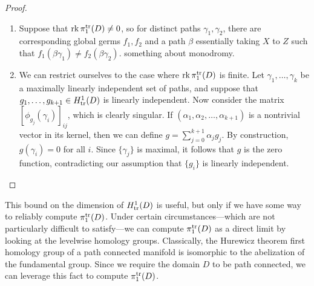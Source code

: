 \begin{proof}
  \phantom{hello!}
\begin{enumerate}
    \item Suppose that \(\operatorname{rk} \pi_1^{\operatorname{tr}}(D) \neq 0\), so for distinct paths
        \(\gamma_1,\gamma_2\), there are corresponding global germs \(f_1,f_2\)
        and a path \(\beta\) essentially taking \(X\) to \(Z\) such that
        \(f_1(\beta\gamma_1)\neq f_2(\beta\gamma_2)\). {\color{blue} something
        about monodromy.}

    \item We can restrict ourselves to the case where \(\operatorname{rk} \pi_1^{\operatorname{tr}}(D)\) is
        finite. Let \(\gamma_1, \dots ,\gamma_k\) be a maximally linearly
        independent set of paths, and suppose that
        \(g_1, \dots , g_{k+1} \in H^1_{\operatorname{tr}}(D)\) is linearly independent. Now
        consider the matrix \([\phi_{g_j}(\gamma_i)]_{ij}\), which is clearly
        singular. If \((\alpha_1, \alpha_2, \dots, \alpha_{k+1})\) is a
        nontrivial vector in its
        kernel, then we can define \(g = \sum_{j=0}^{k+1} \alpha_j g_j\). By
        construction, \(g(\gamma_i)=0\) for all \(i\). Since \(\{\gamma_j\} \)
        is maximal, it follows that \(g\) is the zero function, contradicting
        our assumption that \(\{g_i\} \) is linearly independent.
\end{enumerate}
\end{proof}

This bound on the dimension of \(H^1_{\operatorname{tr}}(D)\) is useful, but only if we have some
way to reliably compute \(\pi_1^{\operatorname{tr}}(D)\). Under certain circumstances---which
are not particularly difficult to satisfy---we can compute \(\pi_1^{\operatorname{tr}}(D)\) as
a direct limit by looking at the levelwise homology groups. Classically, the
Hurewicz theorem
first homology group of a path connected manifold is isomorphic to the
abelization of the fundamental group. Since we require the domain \(D\) to be
path connected, we can leverage this fact to compute \(\pi_1^{\operatorname{tr}}(D)\).

